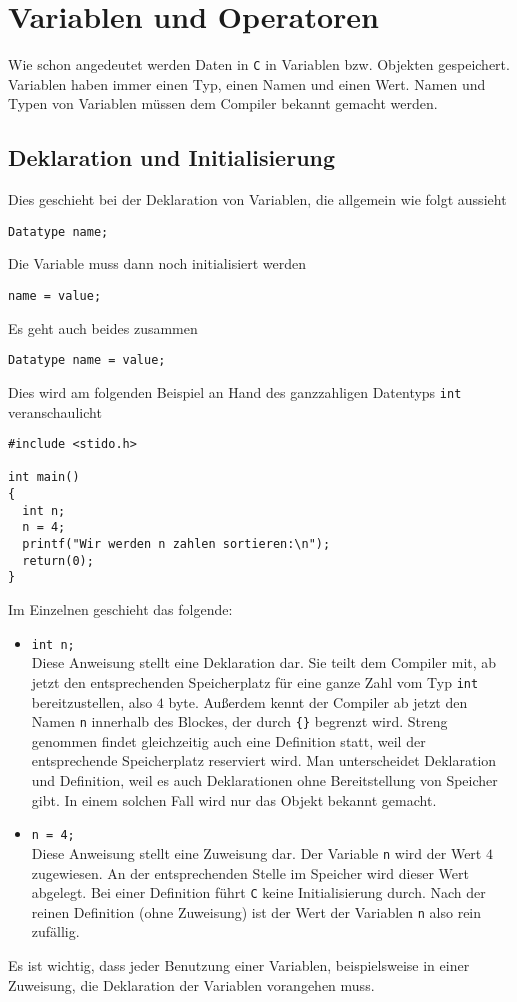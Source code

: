 \section{Variablen und Operatoren}

Wie schon angedeutet werden Daten in \texttt{C} in Variablen bzw. Objekten gespeichert.
Variablen haben immer einen Typ, einen Namen und einen Wert.
Namen und Typen von Variablen müssen dem Compiler bekannt gemacht werden.

\subsection{Deklaration und Initialisierung}

Dies geschieht bei der Deklaration von Variablen, die allgemein wie folgt aussieht
\begin{lstlisting}
Datatype name;
\end{lstlisting}
Die Variable muss dann noch initialisiert werden
\begin{lstlisting}
name = value;
\end{lstlisting}
Es geht auch beides zusammen
\begin{lstlisting}
Datatype name = value;
\end{lstlisting}
Dies wird am folgenden Beispiel an Hand des ganzzahligen Datentyps \texttt{int} veranschaulicht
\begin{lstlisting}[caption={Erste Variablendeklaration und -zuweisung}, belowcaptionskip=0.3em]
#include <stido.h>

int main()
{
  int n;
  n = 4;
  printf("Wir werden n zahlen sortieren:\n");
  return(0);
}
\end{lstlisting}
Im Einzelnen geschieht das folgende:
\begin{itemize}
\item \texttt{int n;}\\
  Diese Anweisung stellt eine Deklaration dar.
  Sie teilt dem Compiler mit, ab jetzt den ent\-sprechenden Speicherplatz für eine ganze Zahl vom Typ \texttt{int} bereitzustellen, also $4$ byte.
  Außerdem kennt der Compiler ab jetzt den Namen \texttt{n} innerhalb des Blockes, der durch \texttt{\{\}} begrenzt wird.
  Streng genommen findet gleichzeitig auch eine Definition statt, weil der ent\-sprechende Speicherplatz reserviert wird. 
  Man unterscheidet Deklaration und Definition, weil es auch Deklarationen ohne Bereitstellung von Speicher gibt.
  In einem solchen Fall wird nur das Objekt bekannt gemacht.

\item \verb|n = 4;|\\
  Diese Anweisung stellt eine Zuweisung dar.
  Der Variable \texttt{n} wird der Wert $4$ zugewiesen.
  An der entsprechenden Stelle im Speicher wird dieser Wert abgelegt.
  Bei einer Definition führt \texttt{C} keine Initialisierung durch.
  Nach der reinen Definition (ohne Zuweisung) ist der Wert der Variablen \texttt{n} also rein zufällig.
\end{itemize}
Es ist wichtig, dass jeder Benutzung einer Variablen, beispielsweise in einer Zuweisung, die Deklaration der Variablen vorangehen muss.

